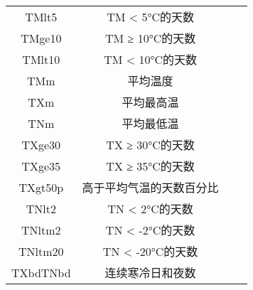 \begin{longtable}{cccc}
    TMlt5    & TM < 5°C的天数    &         &                \\
    TMge10   & TM ≥ 10°C的天数   &         &                \\
    TMlt10   & TM < 10°C的天数   &         &                \\
    TMm      & 平均温度           &         &                \\
    TXm      & 平均最高温          &         &                \\
    TNm      & 平均最低温          &         &                \\
    TXge30   & TX ≥ 30°C的天数   &         &                \\
    TXge35   & TX ≥ 35°C的天数   &         &                \\
    TXgt50p  & 高于平均气温的天数百分比   &         &                \\
    TNlt2    & TN < 2°C的天数    &         &                \\
    TNltm2   & TN < -2°C的天数   &         &                \\
    TNltm20  & TN < -20°C的天数  &         &                \\
    TXbdTNbd & 连续寒冷日和夜数       &         &                \\
    \bottomrule
\end{longtable}
